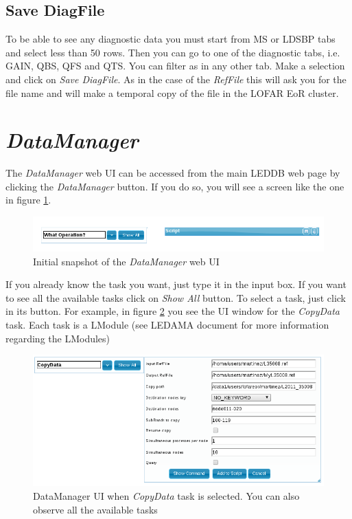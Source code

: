 \documentclass[a4paper,11pt]{article}
\begin{document}
\subsection{Save DiagFile}
\label{sec:creatediag}
To be able to see any diagnostic data you must start from MS or LDSBP tabs and select less than 50 rows. Then you can go to one of the diagnostic tabs, i.e. GAIN, QBS, QFS and QTS. You can filter as in any other tab. Make a selection and click on \textit{Save DiagFile}. As in the case of the \textit{RefFile} this will ask you for the file name and will make a temporal copy of the file in the LOFAR EoR cluster.


\section{\textit{DataManager}}
\label{sec:datamanager}

The \textit{DataManager} web UI can be accessed from the main LEDDB web page by clicking the \textit{DataManager} button. If you do so, you will see a screen like the one in figure \ref{fig:dmwebui}.

\begin{figure}[h]
	\centering
	\includegraphics[scale=0.40]{fig/datamanagerinit} 
	\caption{Initial snapshot of the \textit{DataManager} web UI}
	\label{fig:dmwebui}
\end{figure}

If you already know the task you want, just type it in the input box. If you want to see all the available tasks click on \textit{Show All} button. To select a task, just click in its button. For example, in figure \ref{fig:copy} you see the UI window for the \textit{CopyData} task. Each task is a LModule (see LEDAMA document for more information regarding the LModules)

\begin{figure}[h]
	\centering
	\includegraphics[scale=0.50]{fig/guicopy} 
	\caption{DataManager UI when \textit{CopyData} task is selected. You can also observe all the available tasks}
	\label{fig:copy}
\end{figure}
\end{document}
